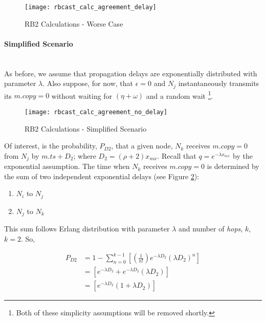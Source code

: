     \begin{figure}[H]
                \centering    
                \centerline{\texttt{[image: rbcast\_calc\_agreement\_delay]}}
                \caption[RB2 Calculations - Worse Case]{RB2 Calculations - Worse Case}
                 \label{fig:rbcast_a_delay}
        \end{figure} 
    
    \paragraph{Simplified Scenario} \hfill \\    
    As before, we assume that propagation delays are exponentially distributed with parameter $\lambda$.  Also suppose, for now, that $\epsilon = 0$ and $N_j$ instantaneously transmits its $m.copy = 0$ without waiting for $(\eta + \omega)$ and a random wait \footnote{Both of these simplicity assumptions will be removed shortly.}.  
    
        \begin{figure}[h]
                \centering    
                \centerline{\texttt{[image: rbcast\_calc\_agreement\_no\_delay]}}
                \caption[RB2 Calculations - Simplified Scenario]{RB2 Calculations - Simplified Scenario}
                \label{fig:rbcast_a_no_delay}
        \end{figure} 
        
    Of interest, is the probability, $P_{D2}$, that a given node, $N_k$ receives $m.copy = 0$ from $N_j$ by $m.ts + D_2$; where $D_2 = (\rho + 2) x_{mx}$.  Recall that $q  = e^{-\lambda x_{mx}}$ by the exponential assumption.  The time when $N_k$ receives $m.copy = 0$ is determined by the sum of two independent exponential delays (see Figure \ref{fig:rbcast_a_no_delay}):
    \begin{enumerate}[label=\roman*]
        \item    $N_i$ to $N_j$
        \item    $N_j$ to $N_k$
    \end{enumerate}
    
    This sum follows Erlang distribution with parameter $\lambda$ and number of \emph{hops}, $k$, $k = 2$.  So,
    
    \begin{equation}
        \label{eq:pd_2_original}
        \begin{split}
                P_{D2} &= 1 - \sum\limits_{n=0}^{k-1}\left[ \left(\frac{1}{n!}\right) e^{-\lambda D_2} \left( \lambda D_2 \right)^n  \right] \\
                &=    \left[ e^{-\lambda D_2} + e^{-\lambda D_2}\left( \lambda D_2 \right)     \right] \\
                &=    \left[ e^{-\lambda D_2} \left( 1 + \lambda D_2 \right)    \right]
        \end{split}
    \end{equation}
        
